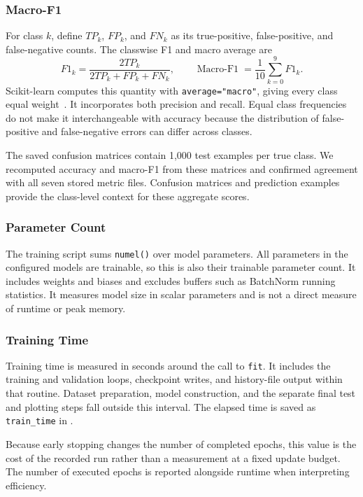 \subsubsection{Macro-F1}

For class $k$, define $TP_k$, $FP_k$, and $FN_k$ as its true-positive, false-positive, and false-negative counts. The classwise F1 and macro average are
\begin{equation}
    F1_k=\frac{2TP_k}{2TP_k+FP_k+FN_k},
    \qquad
    \operatorname{Macro\text{-}F1}=\frac{1}{10}\sum_{k=0}^{9}F1_k.
\end{equation}
Scikit-learn computes this quantity with \texttt{average="macro"}, giving every class equal weight~\cite{sklearn-f1}. It incorporates both precision and recall. Equal class frequencies do not make it interchangeable with accuracy because the distribution of false-positive and false-negative errors can differ across classes.

The saved confusion matrices contain 1,000 test examples per true class. We recomputed accuracy and macro-F1 from these matrices and confirmed agreement with all seven stored metric files. Confusion matrices and prediction examples provide the class-level context for these aggregate scores.

\subsubsection{Parameter Count}

The training script sums \texttt{numel()} over model parameters. All parameters in the configured models are trainable, so this is also their trainable parameter count. It includes weights and biases and excludes buffers such as BatchNorm running statistics. It measures model size in scalar parameters and is not a direct measure of runtime or peak memory.

\subsubsection{Training Time}

Training time is measured in seconds around the call to \texttt{fit}. It includes the training and validation loops, checkpoint writes, and history-file output within that routine. Dataset preparation, model construction, and the separate final test and plotting steps fall outside this interval. The elapsed time is saved as \texttt{train\_time} in .

Because early stopping changes the number of completed epochs, this value is the cost of the recorded run rather than a measurement at a fixed update budget. The number of executed epochs is reported alongside runtime when interpreting efficiency.

